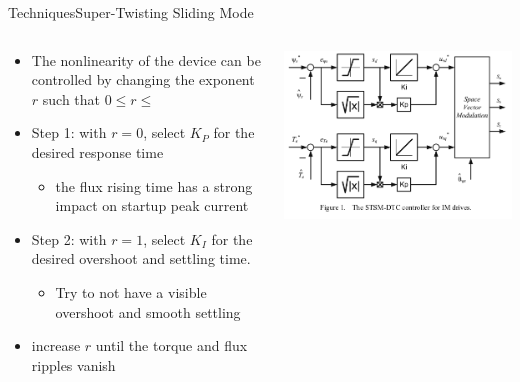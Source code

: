\documentclass{beamer}
\begin{document}
\begin{frame}{Techniques}{Super-Twisting Sliding Mode\cite{6954103}}
\begin{columns}
    \begin{column}{0.47\textwidth}
        \begin{itemize}
        		\item The nonlinearity of the device can be controlled by changing the exponent $r$ such that $0 \leq r \leq $
			\item Step 1: with $r=0$, select $K_P$ for the desired response time
			\begin{itemize}
				\item the flux rising time has a strong impact on startup peak current
			\end{itemize}
			\item Step 2: with $r=1$, select $K_I$ for the desired overshoot and settling time.  
				\begin{itemize}
					\item Try to not have a visible overshoot and smooth settling
				\end{itemize}
			\item increase $r$ until the torque and flux ripples vanish
        \end{itemize}
    \end{column}
    \begin{column}{0.5\textwidth}
        \includegraphics[scale=.25]{./images/stsm_dtc_controller.png}
    \end{column}
\end{columns}
\end{frame}
\end{document}
